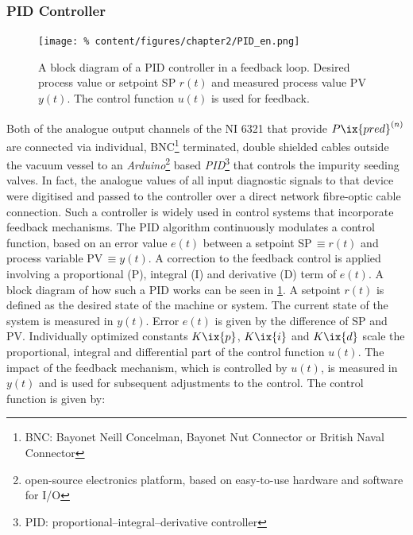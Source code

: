            \subsubsection*{PID Controller}%
%
                \begin{figure}%
                    \centering%
                    \texttt{[image: \%
                        content/figures/chapter2/PID\_en.png]}%
                    \caption{A block diagram of a PID controller in a feedback loop. Desired process value or setpoint SP $r\left(t\right)$ and measured process value PV $y\left(t\right)$. The control function $u\left(t\right)$ is used for feedback\cite{WikiPID}.}\label{fig:pid}
                \end{figure}%
%
                Both of the analogue output channels of the NI\textsuperscript{\textregistered} 6321 that provide $P\ix{pred}^{\left(n\right)}$ are connected via individual, BNC\footnote[1]{BNC: Bayonet Neill Concelman, Bayonet Nut Connector or British Naval Connector} terminated, double shielded cables outside the vacuum vessel to an \textit{Arduino}\footnote[2]{open-source electronics platform, based on easy-to-use hardware and software for I/O} based \textit{PID}\footnote[3]{PID: proportional–integral–derivative controller} that controls the impurity seeding valves. In fact, the analogue values of all input diagnostic signals to that device were digitised and passed to the controller over a direct network fibre-optic cable connection. Such a controller is widely used in control systems that incorporate feedback mechanisms. The PID algorithm continuously modulates a control function, based on an error value $e\left(t\right)$ between a setpoint SP$\,\equiv r\left(t\right)$ and process variable PV$\,\equiv y\left(t\right)$. A correction to the feedback control is applied involving a proportional (P), integral (I) and derivative (D) term of $e\left(t\right)$. A block diagram of how such a PID works can be seen in \cref{fig:pid}. A setpoint $r\left(t\right)$ is defined as the desired state of the machine or system. The current state of the system is measured in $y\left(t\right)$. Error $e\left(t\right)$ is given by the difference of SP and PV. Individually optimized constants $K\ix{p}$, $K\ix{i}$ and $K\ix{d}$ scale the proportional, integral and differential part of the control function $u\left(t\right)$. The impact of the feedback mechanism, which is controlled by $u\left(t\right)$, is measured in $y\left(t\right)$ and is used for subsequent adjustments to the control. The control function is given by:%

